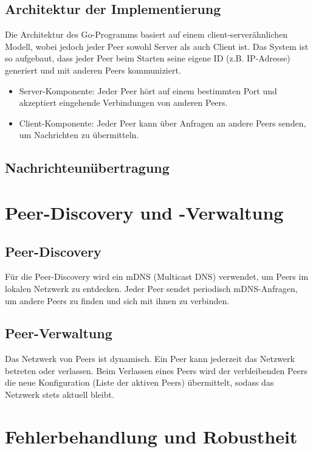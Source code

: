 \subsection{Architektur der Implementierung}

Die Architektur des Go-Programms basiert auf einem client-serverähnlichen Modell, wobei jedoch jeder Peer sowohl Server als auch Client ist. Das System ist so aufgebaut, dass jeder Peer beim Starten seine eigene ID (z.B. IP-Adresse) generiert und mit anderen Peers kommuniziert.

\begin{itemize}
    \item Server-Komponente: Jeder Peer hört auf einem bestimmten Port und akzeptiert eingehende Verbindungen von anderen Peers.
    \item Client-Komponente: Jeder Peer kann über Anfragen an andere Peers senden, um Nachrichten zu übermitteln.
\end{itemize}


\subsection{Nachrichteunübertragung}

\section{Peer-Discovery und -Verwaltung}

\subsection{Peer-Discovery}

Für die Peer-Discovery wird ein mDNS (Multicast DNS) verwendet, um Peers im lokalen Netzwerk zu entdecken. Jeder Peer sendet periodisch mDNS-Anfragen, um andere Peers zu finden und sich mit ihnen zu verbinden. \cite{mdns}

\subsection{Peer-Verwaltung}

Das Netzwerk von Peers ist dynamisch.
Ein Peer kann jederzeit das Netzwerk betreten oder verlassen. Beim Verlassen eines Peers wird der verbleibenden Peers die neue Konfiguration (Liste der aktiven Peers) übermittelt, sodass das Netzwerk stets aktuell bleibt.

\section{Fehlerbehandlung und Robustheit}

